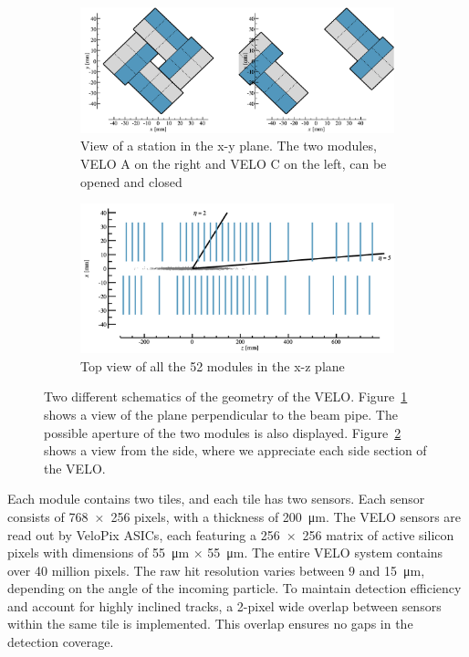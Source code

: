 \begin{figure}
    \centering
    \begin{subfigure}{0.48\textwidth}
    \includegraphics[width=\linewidth]{figures/aperture.png}
    \caption{View of a station in the x-y plane. The two modules, VELO A on the right and VELO C on the left, can be opened and closed}\label{fig_velo-xy}
    \end{subfigure}
    \begin{subfigure}{0.48\textwidth}
    \includegraphics[width=\linewidth]{figures/above_view.png}
    \caption{Top view of all the 52 modules in the x-z plane}\label{fig_velo-side}
    \end{subfigure}
    \caption{Two different schematics of the geometry of the VELO. Figure~\ref{fig_velo-xy} shows a view of the plane perpendicular to the beam pipe. The possible aperture of the two modules is also displayed. Figure~\ref{fig_velo-side} shows a view from the side, where we appreciate each side section of the VELO.}
    \label{fig:velo-geometry}
\end{figure}

Each module contains two tiles, and each tile has two sensors. Each sensor consists of 768~×~256 pixels, with a thickness of \SI{200}{\micro\meter}. 
The VELO sensors are read out by VeloPix ASICs, each featuring a 256~×~256 matrix of active silicon pixels with dimensions of \SI{55}{\micro\meter} × \SI{55}{\micro\meter}. The entire VELO system contains over 40 million pixels. The raw hit resolution varies between $9$ and \SI{15}{\micro\meter}, depending on the angle of the incoming particle. To maintain detection efficiency and account for highly inclined tracks, a 2-pixel wide overlap between sensors within the same tile is implemented. This overlap ensures no gaps in the detection coverage.

